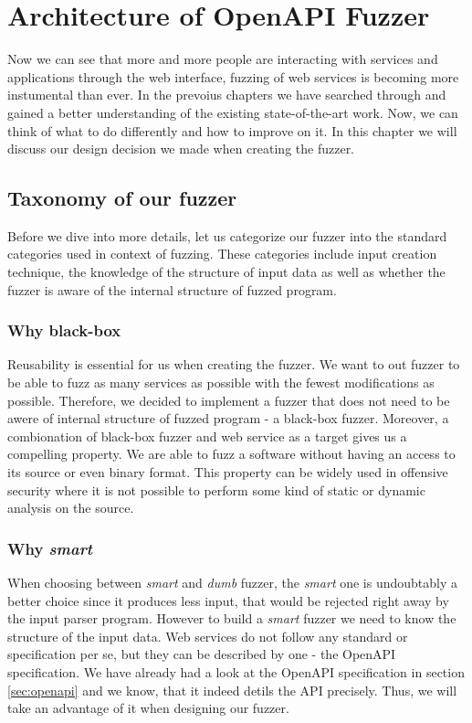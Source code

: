 \chapter{Architecture of OpenAPI Fuzzer}
Now we can see that more and more people are interacting with services and applications through the web interface, fuzzing of web services is becoming more instumental than ever. In the prevoius chapters we have searched through and gained a better understanding of the existing state-of-the-art work. Now, we can think of what to do differently and how to improve on it. In this chapter we will discuss our design decision we made when creating the fuzzer.

\section{Taxonomy of our fuzzer}
Before we dive into more details, let us categorize our fuzzer into the standard categories used in context of fuzzing. These categories include input creation technique, the knowledge of the structure of input data as well as whether the fuzzer is aware of the internal structure of fuzzed program.

\subsection{Why black-box}
Reusability is essential for us when creating the fuzzer. We want to out fuzzer to be able to fuzz as many services as possible with the fewest modifications as possible. Therefore, we decided to implement a fuzzer that does not need to be awere of internal structure of fuzzed program - a black-box fuzzer. Moreover, a combionation of black-box fuzzer and web service as a target gives us a compelling property. We are able to fuzz a software without having an access to its source or even binary format. This property can be widely used in offensive security where it is not possible to perform some kind of static or dynamic analysis on the source.

\subsection{Why \textit{smart}}
When choosing between \textit{smart} and \textit{dumb} fuzzer, the \textit{smart} one is undoubtably a better choice since it produces less input, that would be rejected right away by the input parser program. However to build a \textit{smart} fuzzer we need to know the structure of the input data. Web services do not follow any standard or specification per se, but they can be described by one - the OpenAPI specification. We have already had a look at the OpenAPI specification in section \ref{sec:openapi} and we know, that it indeed detils the API precisely. Thus, we will take an advantage of it when designing our fuzzer.

